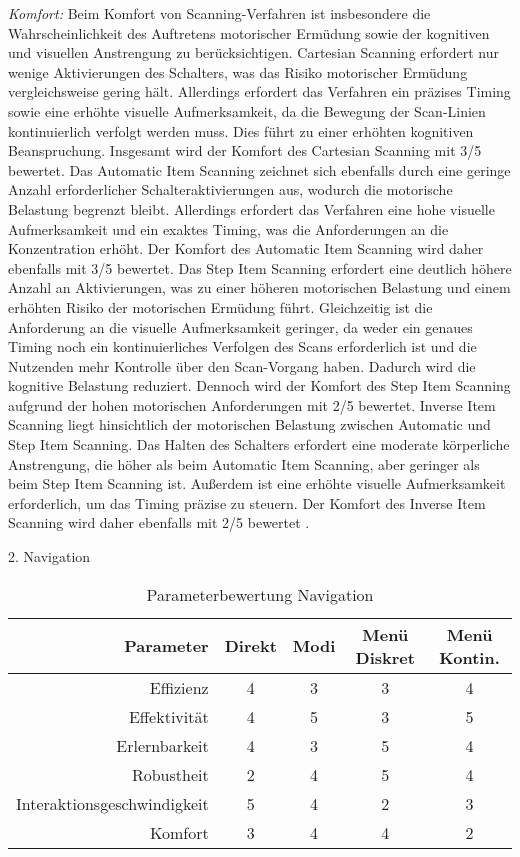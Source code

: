 \textit{Komfort:} 
Beim Komfort von Scanning-Verfahren ist insbesondere die Wahrscheinlichkeit des Auftretens motorischer Ermüdung sowie der kognitiven und visuellen Anstrengung zu berücksichtigen.
Cartesian Scanning erfordert nur wenige Aktivierungen des Schalters, was das Risiko motorischer Ermüdung vergleichsweise gering hält. Allerdings erfordert das Verfahren ein präzises Timing sowie eine erhöhte visuelle Aufmerksamkeit, da die Bewegung der Scan-Linien kontinuierlich verfolgt werden muss. Dies führt zu einer erhöhten kognitiven Beanspruchung. Insgesamt wird der Komfort des Cartesian Scanning mit 3/5 bewertet. Das Automatic Item Scanning zeichnet sich ebenfalls durch eine geringe Anzahl erforderlicher Schalteraktivierungen aus, wodurch die motorische Belastung begrenzt bleibt. Allerdings erfordert das Verfahren eine hohe visuelle Aufmerksamkeit und ein exaktes Timing, was die Anforderungen an die Konzentration erhöht. Der Komfort des Automatic Item Scanning wird daher ebenfalls mit 3/5 bewertet. Das Step Item Scanning erfordert eine deutlich höhere Anzahl an Aktivierungen, was zu einer höheren motorischen Belastung und einem erhöhten Risiko der motorischen Ermüdung führt. Gleichzeitig ist die Anforderung an die visuelle Aufmerksamkeit geringer, da weder ein genaues Timing noch ein kontinuierliches Verfolgen des Scans erforderlich ist und die Nutzenden mehr Kontrolle über den Scan-Vorgang haben. Dadurch wird die kognitive Belastung reduziert. Dennoch wird der Komfort des Step Item Scanning aufgrund der hohen motorischen Anforderungen mit 2/5 bewertet. Inverse Item Scanning liegt hinsichtlich der motorischen Belastung zwischen Automatic und Step Item Scanning. Das Halten des Schalters erfordert eine moderate körperliche Anstrengung, die höher als beim Automatic Item Scanning, aber geringer als beim Step Item Scanning ist. Außerdem ist eine erhöhte visuelle Aufmerksamkeit erforderlich, um das Timing präzise zu steuern. Der Komfort des Inverse Item Scanning wird daher ebenfalls mit 2/5 bewertet \citep{COOK2015117}.

2. Navigation 

\begin{table}[ht]
 \centering
 \begin{tabular}{r|c|c|c|c} 
 Parameter & Direkt & Modi & Menü Diskret & Menü Kontin.\\
 \hline
 Effizienz & 4 & 3 & 3 & 4\\
 Effektivität & 4 & 5 & 3 & 5\\
 Erlernbarkeit & 4 & 3 & 5 & 4\\
 Robustheit & 2 & 4 & 5 & 4\\
 Interaktionsgeschwindigkeit & 5 & 4 & 2 & 3\\
 Komfort & 3 & 4 & 4 & 2\\
 \end{tabular}
 \caption{Parameterbewertung Navigation}
 \label{tab:Navi}
\end{table}

